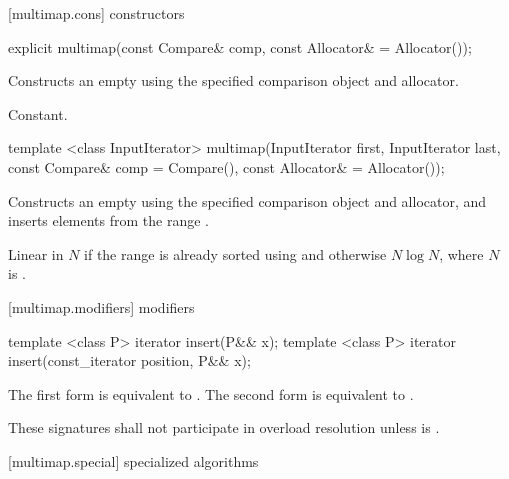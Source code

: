 [multimap.cons]{ constructors}

%
\begin{itemdecl}
explicit multimap(const Compare& comp, const Allocator& = Allocator());
\end{itemdecl}

\begin{itemdescr}
\pnum
\effects
Constructs an empty
using the specified comparison object and allocator.

\pnum
\complexity
Constant.
\end{itemdescr}

%
\begin{itemdecl}
template <class InputIterator>
  multimap(InputIterator first, InputIterator last,
           const Compare& comp = Compare(),
           const Allocator& = Allocator());
\end{itemdecl}

\begin{itemdescr}
\pnum
\effects
Constructs an empty
using the specified comparison object and allocator,
and inserts elements from the range
.

\pnum
\complexity
Linear in $N$ if the range
is already sorted using 
and otherwise $N \log{N}$,
where $N$ is
.
\end{itemdescr}

[multimap.modifiers]{ modifiers}

%
\begin{itemdecl}
template <class P> iterator insert(P&& x);
template <class P> iterator insert(const_iterator position, P&& x);
\end{itemdecl}

\begin{itemdescr}
\pnum
\effects
The first form is equivalent to 
. The second form is
equivalent to .

\pnum
\remarks
These signatures shall not participate in overload resolution
unless  is
.
\end{itemdescr}

[multimap.special]{ specialized algorithms}

